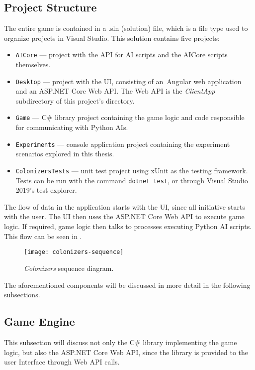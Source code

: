 \subsection{Project Structure}

The entire game is contained in a .sln (solution) file, which is a file type used
to organize projects in Visual Studio. This solution contains five projects:
\begin{itemize}
    \item \texttt{AICore} --- project with the API for AI scripts and the AICore
        scripts themselves.
    \item \texttt{Desktop} --- project with the UI, consisting of an~Angular
        web application and an ASP.NET Core Web API. The Web API is the
        \emph{ClientApp} subdirectory of this project's directory.
    \item \texttt{Game} --- C\# library project containing the game logic
        and code responsible for communicating with Python AIs.
    \item \texttt{Experiments} --- console application project containing
        the experiment scenarios explored in this thesis.
    \item \texttt{ColonizersTests} --- unit test project using xUnit
        as the testing framework. Tests can be run with the command
        \texttt{dotnet test}, or through Visual Studio 2019's test explorer.
\end{itemize}

The flow of data in the application starts with the UI, since all initiative starts
with the user. The UI then uses the ASP.NET Core Web API to execute game logic.
If required, game logic then talks to processes executing Python AI scripts.
This flow can be seen in .

\begin{figure}[ht]
\centerline{\mbox{\texttt{[image: colonizers-sequence]}}}
\caption{\emph{Colonizers} sequence diagram.}\label{dd:sequence}
\end{figure}

The aforementioned components will be discussed in more detail in the following subsections.

\subsection{Game Engine}

This subsection will discuss not only the C\# library implementing the game logic,
but also the ASP.NET Core Web API, since the library is provided to the user Interface
through Web API calls.

